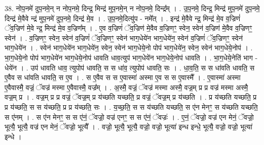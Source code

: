 \documentclass[17pt]{extarticle}
\begin{document}
38. नोप॒नमे॑ दुप॒नमे॒न् न नोप॒नमे॒ दिन्द्र॒ मिन्द्र॑ मुप॒नमे॒न् न नोप॒नमे॒ दिन्द्र᳚म् । . उ॒प॒नमे॒ दिन्द्र॒ मिन्द्र॑ मुप॒नमे॑ दुप॒नमे॒ दिन्द्र॑ मे॒वैवे न्द्र॑ मुप॒नमे॑ दुप॒नमे॒ दिन्द्र॑ मे॒व । . उ॒प॒नमे॒दित्यु॑प - नमे᳚त् । . इन्द्र॑ मे॒वैवे न्द्र॒ मिन्द्र॑ मे॒व व॒ज्रिणं॑ ॅव॒ज्रिण॑ मे॒वे न्द्र॒ मिन्द्र॑ मे॒व व॒ज्रिण᳚म् । . ए॒व व॒ज्रिणं॑ ॅव॒ज्रिण॑ मे॒वैव व॒ज्रिणꣳ॒॒ स्वेन॒ स्वेन॑ व॒ज्रिण॑ मे॒वैव व॒ज्रिणꣳ॒॒ स्वेन॑ । . व॒ज्रिणꣳ॒॒ स्वेन॒ स्वेन॑ व॒ज्रिणं॑ ॅव॒ज्रिणꣳ॒॒ स्वेन॑ भाग॒धेये॑न भाग॒धेये॑न॒ स्वेन॑ व॒ज्रिणं॑ ॅव॒ज्रिणꣳ॒॒ स्वेन॑ भाग॒धेये॑न । . स्वेन॑ भाग॒धेये॑न भाग॒धेये॑न॒ स्वेन॒ स्वेन॑ भाग॒धेये॒नो पोप॑ भाग॒धेये॑न॒ स्वेन॒ स्वेन॑ भाग॒धेये॒नोप॑ । . भा॒ग॒धेये॒नो पोप॑ भाग॒धेये॑न भाग॒धेये॒नोप॑ धावति धाव॒त्युप॑ भाग॒धेये॑न भाग॒धेये॒नोप॑ धावति । . भा॒ग॒धेये॒नेति॑ भाग - धेये॑न । . उप॑ धावति धाव॒ त्युपोप॑ धावति॒ स स धा॑व॒ त्युपोप॑ धावति॒ सः । . धा॒व॒ति॒ स स धा॑वति धावति॒ स ए॒वैव स धा॑वति धावति॒ स ए॒व । . स ए॒वैव स स ए॒वास्मा॑ अस्मा ए॒व स स ए॒वास्मै᳚ । . ए॒वास्मा॑ अस्मा ए॒वैवास्मै॒ वज्रं॒ ॅवज्र॑ मस्मा ए॒वैवास्मै॒ वज्र᳚म् । . अ॒स्मै॒ वज्रं॒ ॅवज्र॑ मस्मा अस्मै॒ वज्र॒म् प्र प्र वज्र॑ मस्मा अस्मै॒ वज्र॒म् प्र । . वज्र॒म् प्र प्र वज्रं॒ ॅवज्र॒म् प्र य॑च्छति यच्छति॒ प्र वज्रं॒ ॅवज्र॒म् प्र य॑च्छति । . प्र य॑च्छति यच्छति॒ प्र प्र य॑च्छति॒ स स य॑च्छति॒ प्र प्र य॑च्छति॒ सः । . य॒च्छ॒ति॒ स स य॑च्छति यच्छति॒ स ए॑न मेनꣳ॒॒ स य॑च्छति यच्छति॒ स ए॑नम् । . स ए॑न मेनꣳ॒॒ स स ए॑नं॒ ॅवज्रो॒ वज्र॑ एनꣳ॒॒ स स ए॑नं॒ ॅवज्रः॑ । . ए॒नं॒ ॅवज्रो॒ वज्र॑ एन मेनं॒ ॅवज्रो॒ भूत्यै॒ भूत्यै॒ वज्र॑ एन मेनं॒ ॅवज्रो॒ भूत्यै᳚ । . वज्रो॒ भूत्यै॒ भूत्यै॒ वज्रो॒ वज्रो॒ भूत्या॑ इन्ध इन्धे॒ भूत्यै॒ वज्रो॒ वज्रो॒ भूत्या॑ इन्धे । \newline
\end{document}
